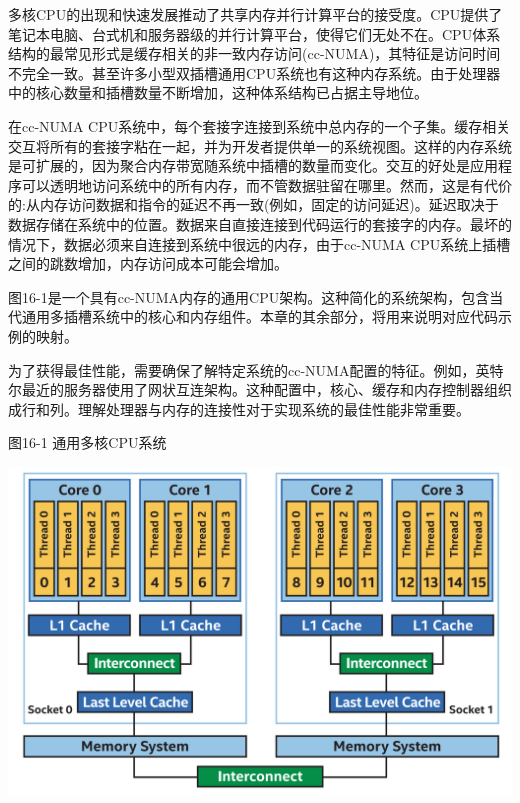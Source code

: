 多核CPU的出现和快速发展推动了共享内存并行计算平台的接受度。CPU提供了笔记本电脑、台式机和服务器级的并行计算平台，使得它们无处不在。CPU体系结构的最常见形式是缓存相关的非一致内存访问(cc-NUMA)，其特征是访问时间不完全一致。甚至许多小型双插槽通用CPU系统也有这种内存系统。由于处理器中的核心数量和插槽数量不断增加，这种体系结构已占据主导地位。\par

在cc-NUMA CPU系统中，每个套接字连接到系统中总内存的一个子集。缓存相关交互将所有的套接字粘在一起，并为开发者提供单一的系统视图。这样的内存系统是可扩展的，因为聚合内存带宽随系统中插槽的数量而变化。交互的好处是应用程序可以透明地访问系统中的所有内存，而不管数据驻留在哪里。然而，这是有代价的:从内存访问数据和指令的延迟不再一致(例如，固定的访问延迟)。延迟取决于数据存储在系统中的位置。数据来自直接连接到代码运行的套接字的内存。最坏的情况下，数据必须来自连接到系统中很远的内存，由于cc-NUMA CPU系统上插槽之间的跳数增加，内存访问成本可能会增加。\par

图16-1是一个具有cc-NUMA内存的通用CPU架构。这种简化的系统架构，包含当代通用多插槽系统中的核心和内存组件。本章的其余部分，将用来说明对应代码示例的映射。\par

为了获得最佳性能，需要确保了解特定系统的cc-NUMA配置的特征。例如，英特尔最近的服务器使用了网状互连架构。这种配置中，核心、缓存和内存控制器组织成行和列。理解处理器与内存的连接性对于实现系统的最佳性能非常重要。\par

\hspace*{\fill} \par %
图16-1 通用多核CPU系统
\begin{center}
	\includegraphics[width=1.0\textwidth]{content/chapter-16/images/2}
\end{center}

